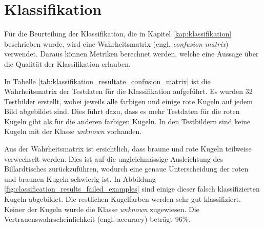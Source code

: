 \section{Klassifikation}
Für die Beurteilung der Klassifikation, die in Kapitel \ref{kap:klassifikation} beschrieben wurde, wird eine
Wahrheitsmatrix\cite{wiki:confusion_matrix} (engl. \emph{confusion matrix}) verwendet.
Daraus können Metriken berechnet werden, welche eine Aussage über die Qualität der Klassifikation erlauben.

In Tabelle \ref{tab:klassifikation_resultate_confusion_matrix} ist die Wahrheitsmatrix der Testdaten
für die Klassifikation aufgeführt. Es wurden 32 Testbilder erstellt, wobei jeweils alle farbigen und einige rote Kugeln
auf jedem Bild abgebildet sind. Dies führt dazu, dass es mehr Testdaten für die roten Kugeln gibt als für die anderen farbigen Kugeln.
In den Testbildern sind keine Kugeln mit der Klasse \emph{unknown} vorhanden.

Aus der Wahrheitsmatrix ist ersichtlich, dass braune und rote Kugeln teilweise verwechselt werden.
Dies ist auf die ungleichmässige Ausleichtung des Billardtisches zurückzuführen, wodurch eine genaue Unterscheidung
der roten und braunen Kugeln schwierig ist.
In Abbildung \ref{fig:classification_results_failed_examples} sind einige dieser falsch klassifizierten Kugeln abgebildet.
Die restlichen Kugelfarben werden sehr gut klassifiziert. Keiner der Kugeln wurde die Klasse \emph{unknown} zugewiesen.
Die Vertrauenswahrscheinlichkeit\cite{wiki:beurteilung_binärer_klassifikator} (engl. accuracy) beträgt 96\%.

